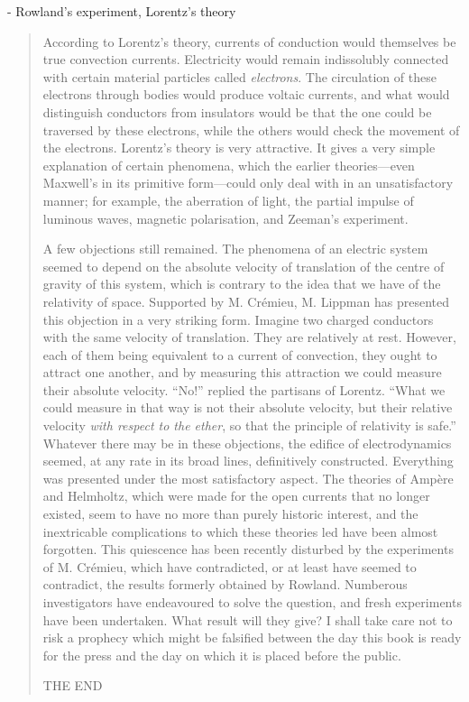 - Rowland's experiment, Lorentz's theory

\begin{quote}
    According to Lorentz's theory, currents of conduction would themselves be true convection currents.  Electricity would remain indissolubly connected with certain material particles called \emph{electrons}.  The circulation of these electrons through bodies would produce voltaic currents, and what would distinguish conductors from insulators would be that the one could be traversed by these electrons, while the others would check the movement of the electrons.  Lorentz's theory is very attractive.  It gives a very simple explanation of certain phenomena, which the earlier theories---even Maxwell's in its primitive form---could only deal with in an unsatisfactory manner; for example, the aberration of light, the partial impulse of luminous waves, magnetic polarisation, and Zeeman's experiment.  
    
    A few objections still remained.  The phenomena of an electric system seemed to depend on the absolute velocity of translation of the centre of gravity of this system, which is contrary to the idea that we have of the relativity of space.  Supported by M. Cr\'emieu, M. Lippman has presented this objection in a very striking form.  Imagine two charged conductors with the same velocity of translation.  They are relatively at rest.  However, each of them being equivalent to a current of convection, they ought to attract one another, and by measuring this attraction we could measure their absolute velocity.  ``No!'' replied the partisans of Lorentz.  ``What we could measure in that way is not their absolute velocity, but their relative velocity \emph{with respect to the ether}, so that the principle of relativity is safe.''  Whatever there may be in these objections, the edifice of electrodynamics seemed, at any rate in its broad lines, definitively constructed.  Everything was presented under the most satisfactory aspect.  The theories of Amp\`ere and Helmholtz, which were made for the open currents that no longer existed, seem to have no more than purely historic interest, and the inextricable complications to which these theories led have been almost forgotten.  This quiescence has been recently disturbed by the experiments of M. Cr\'emieu, which have contradicted, or at least have seemed to contradict, the results formerly obtained by Rowland.  Numberous investigators have endeavoured to solve the question, and fresh experiments have been undertaken.  What result will they give?  I shall take care not to risk a prophecy which might be falsified between the day this book is ready for the press and the day on which it is placed before the public.  
    
    THE END
    
    \citep[p. 242-244]{Poincare1952}
    
    
\end{quote}

